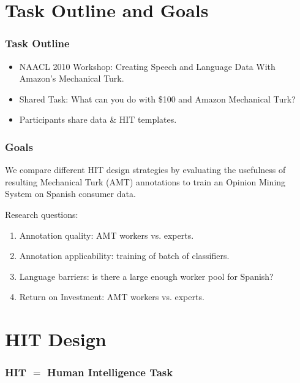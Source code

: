 \documentclass[10pt]{beamer}
\newenvironment{itemwide}%
{\begin{itemize}%
    \setlength{\itemsep}{5pt}%
    \setlength{\parskip}{5pt}}%
  {\end{itemize}}
\begin{document}
\section{Task Outline and Goals}

\begin{frame}
  \frametitle{Task Outline}
\begin{itemwide}
 \item NAACL 2010 Workshop: Creating Speech and Language Data With Amazon's Mechanical Turk.
 \item Shared Task: What can you do with \$100 and Amazon Mechanical Turk?
 \item Participants share data \& HIT templates.
\end{itemwide}

\end{frame}

\begin{frame}
  \frametitle{Goals}
We compare different HIT design strategies by evaluating the usefulness of resulting Mechanical Turk (AMT) annotations to train an Opinion Mining System on Spanish consumer data.\\

\vspace{1cm}

\begin{block}{Research questions:}
 \begin{enumerate}
 \item Annotation quality: AMT workers vs. experts.
 \item Annotation applicability: training of batch of classifiers.
 \item Language barriers: is there a large enough worker pool for Spanish?
 \item Return on Investment: AMT workers vs. experts.
\end{enumerate}
\end{block}

\end{frame}

\section{HIT Design}

\begin{frame}
  \frametitle{HIT $=$ Human Intelligence Task}
  \begin{center}
  \end{center}
\end{frame}
\end{document}
